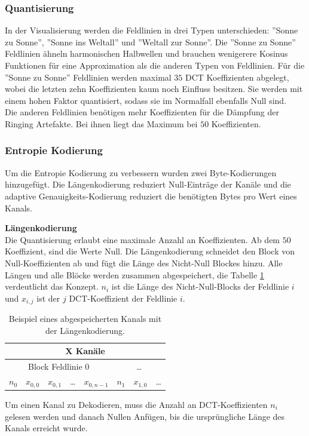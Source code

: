 \subsubsection{Quantisierung}
In der Visualisierung werden die Feldlinien in drei Typen unterschieden: ''Sonne zu Sonne'', ''Sonne ins Weltall'' und ''Weltall zur Sonne''.  Die ''Sonne zu Sonne'' Feldlinien ähneln harmonischen Halbwellen und brauchen wenigerere Kosinus Funktionen für eine Approximation als die anderen Typen von Feldlinien. Für die ''Sonne zu Sonne'' Feldlinien werden maximal $35$ DCT Koeffizienten abgelegt, wobei die letzten zehn Koeffizienten kaum noch Einfluss besitzen. Sie werden mit einem hohen Faktor quantisiert, sodass sie im Normalfall ebenfalls Null sind.\\
Die anderen Feldlinien benötigen mehr Koeffizienten für die Dämpfung der Ringing Artefakte. Bei ihnen liegt das Maximum bei $50$ Koeffizienten.

\subsubsection{Entropie Kodierung}\label{konzept:loesung1:kodierung}
Um die Entropie Kodierung zu verbessern wurden zwei Byte-Kodierungen hinzugefügt. Die Längenkodierung reduziert Null-Einträge der Kanäle und die adaptive Genauigkeits-Kodierung reduziert die benötigten Bytes pro Wert eines Kanals.

\textbf{Längenkodierung}\\
Die Quantisierung erlaubt eine maximale Anzahl an Koeffizienten. Ab dem $50$ Koeffizient, sind die Werte Null. Die Längenkodierung schneidet den Block von Null-Koeffizienten ab und fügt die Länge des Nicht-Null Blockes hinzu. Alle Längen und alle Blöcke werden zusammen abgespeichert, die Tabelle \ref{konzept:loesung1:entropie:laengenkodierung} verdeutlicht das Konzept. $n_i$ ist die Länge des Nicht-Null-Blocks der Feldlinie $i$ und $x_{i,j}$ ist der $j$ DCT-Koeffizient der Feldlinie $i$.

\begin{table}[!htbp]
	\center
	\begin{tabular}{||c|c|c|c|c||c|c|c}
		\hline
		\multicolumn{8}{|c|}{X Kanäle}\\\hline\hline
		 \multicolumn{5}{||c||}{Block Feldlinie 0} & \multicolumn{3}{c}{\ldots} \\\hline
		$n_0$ &$x_{0,0}$ &$x_{0,1}$ & \ldots & $x_{0,n-1}$ & $n_1$ & $x_{1,0}$ & \ldots\\\hline
	\end{tabular}
	\caption{Beispiel eines abgespeicherten Kanals mit der Längenkodierung.}
	\label{konzept:loesung1:entropie:laengenkodierung}
\end{table}
Um einen Kanal zu Dekodieren, muss die Anzahl an DCT-Koeffizienten $n_i$ gelesen werden und danach Nullen Anfügen, bis die ursprüngliche Länge des Kanals erreicht wurde.


